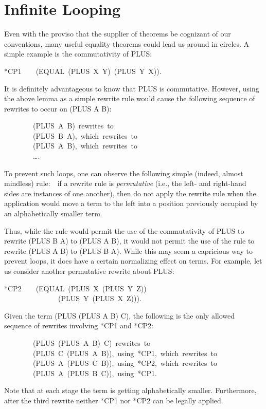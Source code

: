 \documentclass[11pt]{book}
\newenvironment{pubasis}{\begin{flushleft}\ttfamily\small}{\normalsize\rmfamily\end{flushleft}}
\newcommand{\pubinlineunderline}[1]{\emph{#1}}
\newcommand{\pubdefaulttextsize}{\large}
\begin{document}
\section{Infinite Looping}
\pubdefaulttextsize
Even with the proviso that the supplier of theorems be cognizant of our
conventions, many useful equality theorems could lead us around in circles.
A simple example is the commutativity of PLUS:
\begin{pubasis}
*CP1~~~~(EQUAL~(PLUS~X~Y)~(PLUS~Y~X)).\\
\end{pubasis}
It is definitely advantageous to know that PLUS is commutative.  However,
using the above lemma as a simple rewrite rule would cause the following
sequence of rewrites to occur on (PLUS A B):
\begin{pubasis}
~~~~~~~~(PLUS~A~B)~rewrites~to\\
~~~~~~~~(PLUS~B~A),~which~rewrites~to\\
~~~~~~~~(PLUS~A~B),~which~rewrites~to\\
~~~~~~~~\ldots{}.\\
\end{pubasis}

To prevent such loops, one can observe the following simple
(indeed, almost mindless) rule:~~if a rewrite rule is \pubinlineunderline{permutative}
(i.e., the left- and right-hand sides are instances of one another),
then do not apply the rewrite rule when the application
would move a term to the left into a position previously occupied
by an alphabetically smaller term.

Thus, while the rule would permit the use of the commutativity of
PLUS to rewrite (PLUS B A) to (PLUS A B), it would not permit the
use of the rule to rewrite (PLUS A B) to (PLUS B A).  While this may seem
a capricious way to prevent loops, it does have a certain
normalizing effect on terms.  For example, let us consider another
permutative rewrite about PLUS:
\begin{pubasis}
*CP2~~~~(EQUAL~(PLUS~X~(PLUS~Y~Z))\\
~~~~~~~~~~~~~~~(PLUS~Y~(PLUS~X~Z))).\\
\end{pubasis}
Given the term (PLUS (PLUS A B) C), the following is the only
allowed sequence of rewrites involving *CP1 and *CP2:
\begin{pubasis}
~~~~~~~~(PLUS~(PLUS~A~B)~C)~rewrites~to\\
~~~~~~~~(PLUS~C~(PLUS~A~B)),~using~*CP1,~which~rewrites~to\\
~~~~~~~~(PLUS~A~(PLUS~C~B)),~using~*CP2,~which~rewrites~to\\
~~~~~~~~(PLUS~A~(PLUS~B~C)),~using~*CP1.\\
\end{pubasis}
Note that at each stage the term is getting alphabetically smaller.
Furthermore, after the third rewrite neither *CP1 nor *CP2 can be legally
applied.
\end{document}

